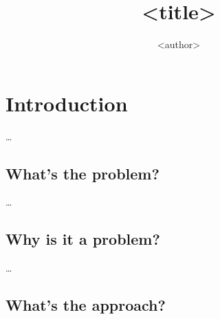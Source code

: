 \title{<title>}
\author{<author>}

\mode*

\begin{frame}
  \maketitle
\end{frame}

\begin{abstract}
  
\end{abstract}

\begin{frame}
\end{frame}

\section{Introduction}

\dots

\subsection{What's the problem?}

\dots


\subsection{Why is it a problem?}

\dots


\subsection{What's the approach?}

